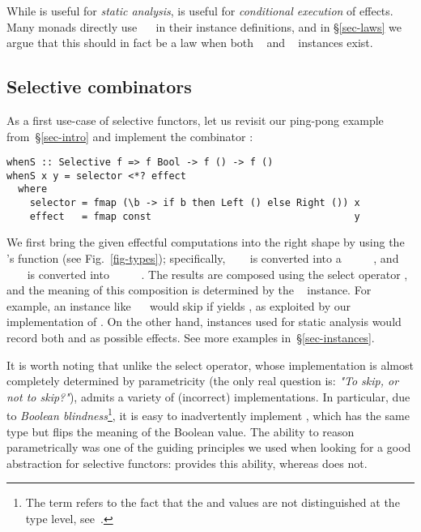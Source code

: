 \noindent
While  is useful for \emph{static analysis},  is
useful for \emph{conditional execution} of effects. Many monads directly use
~\hs{=}~ in their  instance definitions,
and in \S\ref{sec-laws} we argue that this should in fact be a law when both
~ and ~ instances exist.

\subsection{Selective combinators}\label{sec-combinators}

As a first use-case of selective functors, let us revisit our ping-pong example
from~\S\ref{sec-intro} and implement the combinator :

\vspace{1mm}
\begin{verbatim}
whenS :: Selective f => f Bool -> f () -> f ()
whenS x y = selector <*? effect
  where
    selector = fmap (\b -> if b then Left () else Right ()) x
    effect   = fmap const                                   y
\end{verbatim}
\vspace{1mm}

\noindent
We first bring the given effectful computations into the right shape by using
the 's function  (see
Fig.~\ref{fig-types}); specifically, ~\hs{::}~~ is
converted into a ~\hs{::}~~~\hs{()}~\hs{())}, and
~\hs{::}~~\hs{()} is converted into
~\hs{::}~~\hs{(()}~\hs{->}~\hs{())}. The results are composed
using the select operator , and the meaning of this composition is
determined by the ~ instance. For example, an instance
like ~\hs{=}~ would skip  if  yields , as
exploited by our implementation of . On the other hand, instances
used for static analysis would record both  and  as possible
effects. See more examples in~\S\ref{sec-instances}.

It is worth noting that unlike the select operator, whose implementation is
almost completely determined by parametricity (the only real question is:
\emph{"To skip, or not to skip?"}),  admits a variety of (incorrect)
implementations. In particular, due to \emph{Boolean blindness}\footnote{The
term refers to the fact that the  and  values are not
distinguished at the type level, see~\citet{boolean-blindness}.},
it is easy to inadvertently implement , which has the same type but
flips the meaning of the Boolean value. The ability to reason parametrically was
one of the guiding principles we used when looking for a good abstraction for
selective functors:  provides this ability, whereas  does
not.

